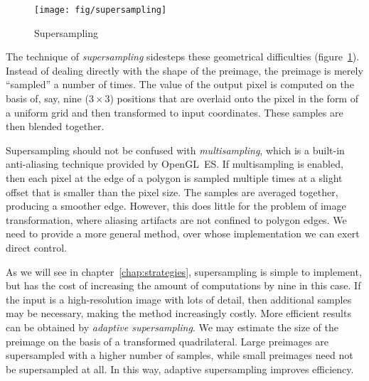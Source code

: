 \documentclass[english,12pt]{ifimaster}
\begin{document}

\begin{figure}
  \centering
  \texttt{[image: fig/supersampling]}
  \caption{Supersampling}
  \label{fig:supersampling}
\end{figure}

The technique of \emph{supersampling} sidesteps these geometrical
difficulties (figure~\ref{fig:supersampling}). Instead of dealing
directly with the shape of the preimage, the preimage is merely
``sampled'' a number of times. The value of the output pixel is
computed on the basis of, say, nine ($3 \times 3$) positions that are
overlaid onto the pixel in the form of a uniform grid and then
transformed to input coordinates. These samples are then blended
together.

Supersampling should not be confused with \emph{multisampling}, which
is a built-in anti-aliasing technique provided by OpenGL~ES. If
multisampling is enabled, then each pixel at the edge of a polygon is
sampled multiple times at a slight offset that is smaller than the
pixel size. The samples are averaged together, producing a smoother
edge. However, this does little for the problem of image
transformation, where aliasing artifacts are not confined to polygon
edges. We need to provide a more general method, over whose
implementation we can exert direct control.


As we will see in chapter~\ref{chap:strategies}, supersampling is
simple to implement, but has the cost of increasing the amount of
computations by nine in this case. If the input is a high-resolution
image with lots of detail, then additional samples may be necessary,
making the method increasingly costly. More efficient results can be
obtained by \emph{adaptive supersampling}. We may estimate the size of
the preimage on the basis of a transformed quadrilateral. Large
preimages are supersampled with a higher number of samples, while
small preimages need not be supersampled at all. In this way, adaptive
supersampling improves efficiency.
\end{document}
